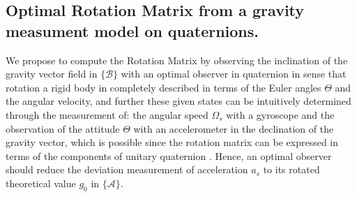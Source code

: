 \documentclass[conference]{IEEEtran}
\newcommand{\marco}[1]{\{\mathcal{#1}\}}
\begin{document}
\subsection{Optimal Rotation Matrix from a gravity measument model on quaternions.}
We propose to compute the Rotation Matrix by observing the inclination of the gravity vector field in $\marco{B}$  with an optimal observer in quaternion  in sense that rotation a rigid body in completely described in terms of the Euler angles $\Theta$ and the angular velocity, and further these given states can be intuitively determined through the measurement of: the angular speed $\Omega_s$ with a gyroscope and the observation of the attitude $\Theta$ with an accelerometer in the declination of the gravity vector, which is possible since the rotation matrix can be expressed in terms of the components of unitary quaternion \cite{Altmann1986}. Hence, an optimal observer should reduce the deviation measurement of acceleration $a_s$ to its rotated theoretical value $g_0$ in $\marco{A}$.\par
\end{document}
